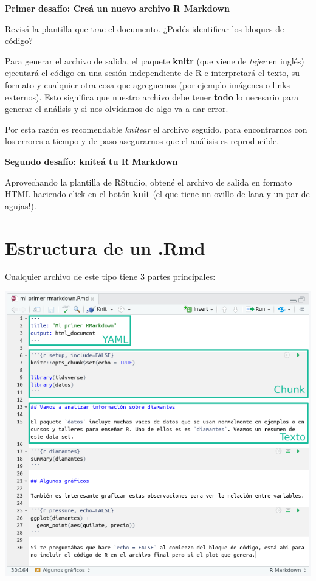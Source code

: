 \documentclass[
  openany]{book}
\begin{document}
\textbf{Primer desafío: Creá un nuevo archivo R Markdown}

Revisá la plantilla que trae el documento.
¿Podés identificar los bloques de código?

Para generar el archivo de salida, el paquete \textbf{knitr} (que viene de \emph{tejer} en inglés) ejecutará el código en una sesión independiente de R e interpretará el texto, su formato y cualquier otra cosa que agreguemos (por ejemplo imágenes o links externos).
Esto significa que nuestro archivo debe tener \textbf{todo} lo necesario para generar el análisis y si nos olvidamos de algo va a dar error.

Por esta razón es recomendable \emph{knitear} el archivo seguido, para encontrarnos con los errores a tiempo y de paso asegurarnos que el análisis es reproducible.

\textbf{Segundo desafío: kniteá tu R Markdown}

Aprovechando la plantilla de RStudio, obtené el archivo de salida en formato HTML haciendo click en el botón \textbf{knit} (el que tiene un ovillo de lana y un par de agujas!).

\hypertarget{estructura-de-un-.rmd}{%
\section{Estructura de un .Rmd}\label{estructura-de-un-.rmd}}

Cualquier archivo de este tipo tiene 3 partes principales:

\includegraphics{img/rmd-ejemplo-secciones.png}
\end{document}
